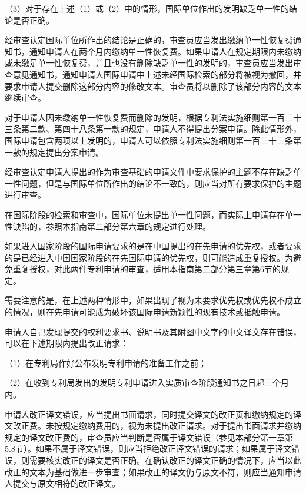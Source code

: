 {\setlength{\parindent}{17.1bp}（3）对于存在上述（1）或（2）中的情形，国际单位作出的发明缺乏单一性的结论是否正确。\par}

经审查认定国际单位所作出的结论是正确的，审查员应当发出缴纳单一性恢复费通知书，通知申请人在两个月内缴纳单一性恢复费。如果申请人在规定期限内未缴纳或未缴足单一性恢复费，并且也没有删除缺乏单一性的发明的，审查员应当发出审查意见通知书，通知申请人国际申请中上述未经国际检索的部分将被视为撤回，并要求申请人提交删除这部分内容的修改文本。审查员将以删除了该部分内容的文本继续审查。

对于申请人因未缴纳单一性恢复费而删除的发明，根据专利法实施细则第一百三十三条第二款、第四十八条第一款的规定，申请人不得提出分案申请。除此情形外，国际申请包含两项以上发明的，申请人可以依照专利法实施细则第一百三十三条第一款的规定提出分案申请。

经审查认定申请人提出的作为审查基础的申请文件中要求保护的主题不存在缺乏单一性问题，但是与国际单位所作出的结论不一致的，则应当对所有要求保护的主题进行审查。

在国际阶段的检索和审查中，国际单位未提出单一性问题，而实际上申请存在单一性缺陷的，参照本指南第二部分第六章的规定进行处理。

如果进入国家阶段的国际申请要求的是在中国提出的在先申请的优先权，或者要求的是已经进入中国国家阶段的在先国际申请的优先权，则可能造成重复授权。为避免重复授权，对此两件专利申请的审查，适用本指南第二部分第三章第6节的规定。

需要注意的是，在上述两种情形中，如果出现了视为未要求优先权或优先权不成立的情况，则在先申请可能成为破坏该国际申请新颖性的现有技术或抵触申请。

申请人自己发现提交的权利要求书、说明书及其附图中文字的中文译文存在错误，可以在下述期限内提出改正请求：

{\setlength{\parindent}{17.1bp}（1）在专利局作好公布发明专利申请的准备工作之前；\par}

{\setlength{\parindent}{17.1bp}（2）在收到专利局发出的发明专利申请进入实质审查阶段通知书之日起三个月内。\par}

申请人改正译文错误，应当提出书面请求，同时提交译文的改正页和缴纳规定的译文改正费。未按规定缴纳费用的，视为未提出改正请求。对于提出书面请求并缴纳规定的译文改正费的，审查员应当判断是否属于译文错误（参见本部分第一章第5.8节）。如果不属于译文错误，则应当拒绝改正译文错误的请求；如果属于译文错误，则需要核实改正的译文是否正确。在确认改正的译文正确的情况下，应当以此改正的文本为基础做进一步审查；如果改正的译文仍与原文不符，则应当通知申请人提交与原文相符的改正译文。


